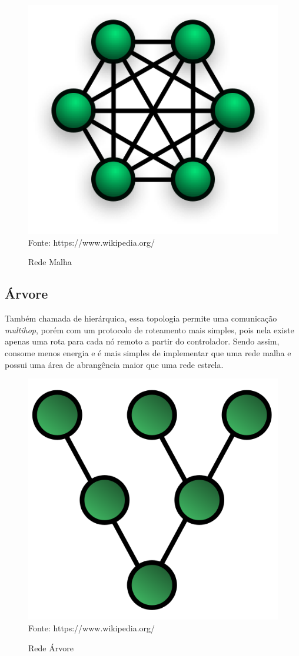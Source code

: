 \begin{figure}[h]
	\caption{Rede Malha}
	\centering
	\includegraphics[scale=0.3]{../images/mesh.png}
	\hspace{\linewidth}
	Fonte: https://www.wikipedia.org/
	\label{figura:mesh}
\end{figure}

\subsection{Árvore}
Também chamada de hierárquica, essa topologia permite uma comunicação \textit{multihop}, porém com um protocolo de
roteamento mais simples, pois nela existe apenas uma rota para cada nó remoto a partir do controlador. Sendo
assim, consome menos energia e é mais simples de implementar que uma rede malha e possui uma área de
abrangência maior que uma rede estrela.

\begin{figure}[h]
	\caption{Rede Árvore}
	\centering
	\includegraphics[scale=0.25]{../images/tree.png}
	\hspace{\linewidth}
	Fonte: https://www.wikipedia.org/
	\label{figura:tree}
\end{figure}
